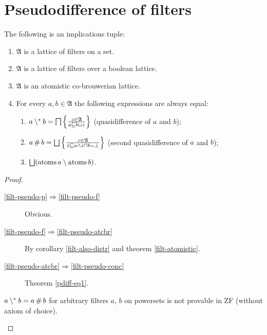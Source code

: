 \section{Pseudodifference of filters}
\begin{prop}
\label{filt-pseudo}The following is an implications tuple:
\begin{enumerate}
\item \label{filt-pseudo-p}$\mathfrak{A}$ is a lattice of filters on a
set.
\item \label{filt-pseudo-f}$\mathfrak{A}$ is a lattice of filters over
a boolean lattice.
\item \label{filt-pseudo-atcbr}$\mathfrak{A}$ is an atomistic co-brouwerian
lattice.
\item \label{filt-pseudo-conc}For every $a,b\in\mathfrak{A}$ the following
expressions are always equal:

\begin{enumerate}
\item $a\setminus^{\ast} b=\bigsqcap\left\{ \frac{z\in\mathfrak{A}}{a\sqsubseteq b\sqcup z}\right\}$
(quasidifference of $a$ and $b$);
\item $a\mathop\#b=\bigsqcup\left\{ \frac{z\in\mathfrak{A}}{z\sqsubseteq a\land z\sqcap b=\bot}\right\}$
(second quasidifference of $a$ and $b$);
\item $\bigsqcup(\operatorname{atoms} a\setminus\operatorname{atoms} b)$.
\end{enumerate}
\end{enumerate}
\end{prop}
\begin{proof}
~
\begin{description}
\item [{\ref{filt-pseudo-p}$\Rightarrow$\ref{filt-pseudo-f}}] Obvious.
\item [{\ref{filt-pseudo-f}$\Rightarrow$\ref{filt-pseudo-atcbr}}] By
corollary \ref{filt-also-distr} and theorem \ref{filt-atomistic}.
\item [{\ref{filt-pseudo-atcbr}$\Rightarrow$\ref{filt-pseudo-conc}}] Theorem
\ref{pdiff-eq1}.\end{description}
\begin{conjecture}
$a\setminus^{\ast} b=a\mathop\#b$ for arbitrary filters $a$, $b$ on powersets
is not provable in ZF (without axiom of choice).
\end{conjecture}
\end{proof}

